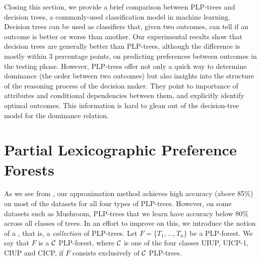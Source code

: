 %

Closing this section, we provide a brief comparison between PLP-trees
and decision trees, a commonly-used classification model in machine learning.
Decision trees can be used as classifiers that, given two outcomes, can
tell if an outcome is better or worse than another.
Our experimental results show that decision trees are generally better than
PLP-trees, although the difference is mostly within 3 percentage points, 
on predicting
preferences between outcomes in the testing phase.
However, PLP-trees offer not only a quick way to determine dominance (the order
between two outcomes) but also insights into the structure of the reasoning 
process of the decision maker. They point to importance of attributes and
conditional dependencies between them, and explicitly identify optimal
outcomes. This information is hard to glean out of the decision-tree model 
for the dominance relation.  


\section{Partial Lexicographic Preference Forests}
\label{sec:forests}
As we see from , our approximation method
achieves high accuracy (above 85\%) on most of the datasets
for all four types of PLP-trees. However, on some datasets such as Mushroom,
PLP-trees that we learn have accuracy below 80\% across all classes of trees.
In an effort to improve on this, we introduce the notion of a
, that is, a \emph{collection} of PLP-trees.
Let $F= \{T_1,\ldots,T_n\}$ be a PLP-forest. We say that $F$ is a 
$\mathcal{C}$ PLP-forest, where $\mathcal{C}$ is one of the four classes UIUP, UICP-1, 
CIUP and CICP, if $F$ consists exclusively of $\mathcal{C}$ PLP-trees. 


